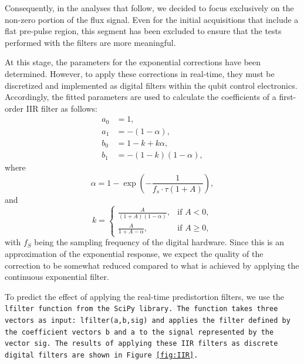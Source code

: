 Consequently, in the analyses that follow, we decided to focus exclusively on the non-zero portion of the flux signal. 
Even for the initial acquisitions that include a flat pre-pulse region, this segment has been excluded to ensure that the tests performed with the filters are more meaningful.

At this stage, the parameters for the exponential corrections have been determined. However, to apply these corrections in real-time, they must be discretized and implemented as digital filters within the qubit control electronics. 
Accordingly, the fitted parameters are used to calculate the coefficients of a first-order IIR filter as follows:
\begin{align}
    a_0 &= 1, \\
    a_1 &= -(1 - \alpha), \\
    b_0 &= 1 - k + k \alpha, \\
    b_1 &= -(1 - k)(1 - \alpha),
\end{align}
where 
\begin{equation}
\alpha = 1 - \exp\left(-\frac{1}{f_s \cdot \tau (1 + A)}\right),
\end{equation}
and
\begin{equation}
    k =
    \begin{cases}
    \frac{A}{(1 + A)(1 - \alpha)}, & \text{if } A < 0, \\
    \frac{A}{1 + A - \alpha}, & \text{if } A \geq 0,
    \end{cases}
\end{equation}
with $f_S$ being the sampling frequency of the digital hardware.
Since this is an approximation of the exponential response, we expect the quality of the correction to be somewhat reduced compared to what is achieved by applying the continuous exponential filter.

To predict the effect of applying the real-time predistortion filters, we use the \tt{lfilter} function from the \tt{SciPy} library. 
The function takes three vectors as input: \tt{lfilter(a,b,sig)} and applies the filter defined by the coefficient vectors \tt{b} and \tt{a} to the signal represented by the vector \tt{sig}. 
The results of applying these IIR filters as discrete digital filters are shown in Figure \ref{fig:IIR}.

